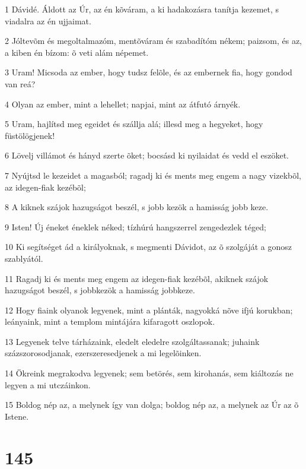 \par 1 Dávidé. Áldott az Úr, az én kõváram, a ki hadakozásra tanítja kezemet, s viadalra az én ujjaimat.
\par 2 Jóltevõm és megoltalmazóm, mentõváram és szabadítóm nékem; paizsom, és az, a kiben én bízom: õ veti alám népemet.
\par 3 Uram! Micsoda az ember, hogy tudsz felõle, és az embernek fia, hogy gondod van reá?
\par 4 Olyan az ember, mint a lehellet; napjai, mint az átfutó árnyék.
\par 5 Uram, hajlítsd meg egeidet és szállja alá; illesd meg a hegyeket, hogy füstölögjenek!
\par 6 Lövelj villámot és hányd szerte õket; bocsásd ki nyilaidat és vedd el eszöket.
\par 7 Nyújtsd le kezeidet a magasból; ragadj ki és ments meg engem a nagy vizekbõl, az idegen-fiak kezébõl;
\par 8 A kiknek szájok hazugságot beszél, s jobb kezök a hamisság jobb keze.
\par 9 Isten! Új éneket éneklek néked; tízhúrú hangszerrel zengedezlek téged;
\par 10 Ki segítséget ád a királyoknak, s megmenti Dávidot, az õ szolgáját a gonosz szablyától.
\par 11 Ragadj ki és ments meg engem az idegen-fiak kezébõl, akiknek szájok hazugságot beszél, s jobbkezök a hamisság jobbkeze.
\par 12 Hogy fiaink olyanok legyenek, mint a plánták, nagyokká nõve ifjú korukban; leányaink, mint a templom mintájára kifaragott oszlopok.
\par 13 Legyenek telve tárházaink, eledelt eledelre szolgáltassanak; juhaink százszorosodjanak, ezerszeresedjenek a mi legelõinken.
\par 14 Ökreink megrakodva legyenek; sem betörés, sem kirohanás, sem kiáltozás ne legyen a mi utczáinkon.
\par 15 Boldog nép az, a melynek így van dolga; boldog nép az, a melynek az Úr az õ Istene.

\chapter{145}

